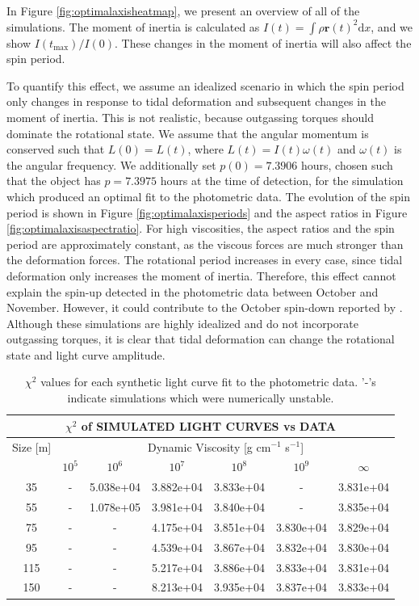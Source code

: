 \documentclass[twocolumn,doublespacing]{aastex631}
\begin{document}
In Figure \ref{fig:optimalaxisheatmap}, we present an overview of all of the simulations. The moment of inertia is calculated as $I(t)=\int\rho \boldsymbol{r}(t)^2\text{d}x$, and we show $I(t_\text{max})/I(0)$. These changes in the moment of inertia will also affect the spin period. 

To quantify this effect, we assume an idealized scenario in which the spin period only changes in response to tidal deformation and subsequent changes in the moment of inertia. This is not realistic, because outgassing torques should dominate the rotational state. We assume that the angular momentum is conserved such that $L(0)=L(t)$, where $L(t)=I(t) \omega(t)$ and $\omega(t)$ is the angular frequency. We additionally set $p(0)=7.3906$ hours, chosen such that the object has $p=7.3975$ hours at the time of detection, for the simulation which produced an optimal fit to the photometric data. The evolution of the spin period is shown in Figure \ref{fig:optimalaxisperiods} and the aspect ratios in Figure \ref{fig:optimalaxisaspectratio}. For high viscosities, the aspect ratios and the spin period are approximately constant, as the viscous forces are much stronger than the deformation forces. The rotational period increases in every case, since tidal deformation only increases the moment of inertia. Therefore, this effect cannot explain the spin-up detected in the photometric data between October and November. However, it could contribute to the October spin-down reported by \citet{flekkoy2019}. Although these simulations are highly idealized and do not incorporate outgassing torques, it is clear that tidal deformation can change the rotational state and light curve amplitude. 

\begin{table}[t]
\begin{tabular}{ |c||c|c|c|c|c|c| } 
 \hline
 \multicolumn{7}{||c||}{$\chi^2$ of SIMULATED LIGHT CURVES vs DATA} \\
 \hline\hline
 \multicolumn{1}{|c}{Size [m]} & \multicolumn{6}{|c|}{Dynamic Viscosity [g cm$^{-1}$ s$^{-1}$]} \\
 \hline\hline
 \multicolumn{1}{|c||}{} & $10^5$ & $10^6$ & $10^7$ & $10^8$ & $10^9$ & $\infty$ \\
 \hline\hline
 35 & - & 5.038e+04 & 3.882e+04 & 3.833e+04 & - & 3.831e+04 \\
 \hline
 55 & - & 1.078e+05 & 3.981e+04 & 3.840e+04 & - & 3.835e+04 \\
\hline
75 & - & - & 4.175e+04 & 3.851e+04 & 3.830e+04 & 3.829e+04 \\
\hline
95 & - & - & 4.539e+04 & 3.867e+04 & 3.832e+04 & 3.830e+04 \\
\hline
115 & - & - & 5.217e+04 & 3.886e+04 & 3.833e+04 & 3.831e+04 \\
\hline
150 & - & - & 8.213e+04 & 3.935e+04 & 3.837e+04 & 3.833e+04 \\
\hline
\end{tabular}
\caption{ $\chi^2$ values for each synthetic light curve fit to the photometric data. '-'s indicate simulations which were numerically unstable.}
\label{table:simdatachi2}
\end{table}
\end{document}
